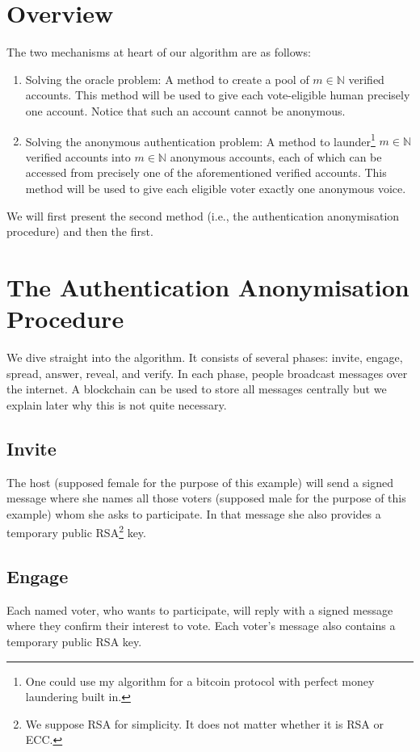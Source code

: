 \documentclass{article}
\newcommand{\N}{\mathbb{N}\xspace}
\theoremstyle{definition}
\begin{document}
	\section{Overview}
	The two mechanisms at heart of our algorithm are as follows:
	\begin{enumerate}
		\item Solving the oracle problem: A method to create a pool of $m \in \N$ verified accounts. This method will be used to give each vote-eligible human precisely one account. Notice that such an account cannot be anonymous.
		\item Solving the anonymous authentication problem: A method to launder\footnote{One could use my algorithm for a bitcoin protocol with perfect money laundering built in.} $m \in \N$ verified accounts into $m \in \N$ anonymous accounts, each of which can be accessed from precisely one of the aforementioned verified accounts. This method will be used to give each eligible voter exactly one anonymous voice.
	\end{enumerate}
	
	We will first present the second method (i.e., the authentication anonymisation procedure) and then the first.
	
	\section{The Authentication Anonymisation Procedure}
	We dive straight into the algorithm. It consists of several phases: invite, engage, spread, answer, reveal, and verify. In each phase, people broadcast messages over the internet. A blockchain can be used to store all messages centrally but we explain later why this is not quite necessary.
	
	\subsection{Invite}
	The host (supposed female for the purpose of this example) will send a signed message where she names all those voters (supposed male for the purpose of this example) whom she asks to participate. In that message she also provides a temporary public RSA\footnote{We suppose RSA for simplicity. It does not matter whether it is RSA or ECC.} key.
	
	\subsection{Engage}
	Each named voter, who wants to participate, will reply with a signed message where they confirm their interest to vote. Each voter's message also contains a temporary public RSA key.
	
\end{document}

